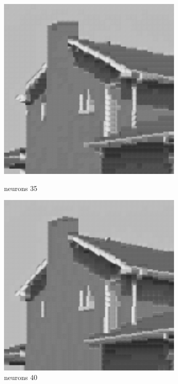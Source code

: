 \documentclass[../IDP_Task5_Karwowski_Kowalewski.tex]{subfiles}
\begin{document}
{{        \begin{figure}[!htbp]
            \begin{minipage}[c]{0.45\linewidth}
                \centering
                \includegraphics[width=0.8\textwidth]{img/kowalewski/crop_size_8_neurons_35.png}
                \caption{neurons 35}
            \end{minipage}\hfill
            \begin{minipage}[c]{0.45\linewidth}
                \centering
                \includegraphics[width=0.8\textwidth]{img/kowalewski/crop_size_8_neurons_40.png}
                \caption{neurons 40}
            \end{minipage}
        \end{figure}

}}
\end{document}
